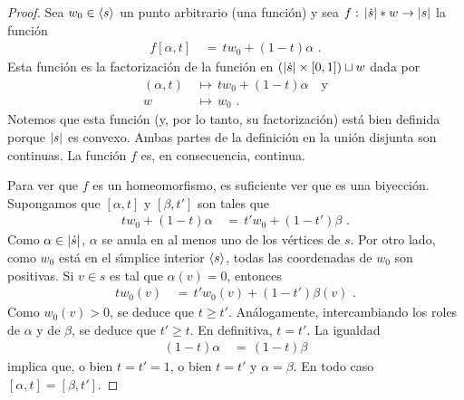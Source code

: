 \begin{proof}
	Sea $w_{0}\in\langle s\rangle$ un punto arbitrario (una funci\'{o}n)
	y sea $f:\,\left|\dot{s}\right|*w\rightarrow\left|s\right|$ la funci\'{o}n
	\begin{align*}
		f[\alpha,t] & \,=\, tw_{0}+(1-t)\alpha
		\text{ .}
	\end{align*}
	Esta funci\'{o}n es la factorizaci\'{o}n de la funci\'{o}n
	en $(\left|\dot{s}\right|\times\left[0,1\right])\sqcup w$ dada por
	\begin{align*}
		(\alpha,t) & \,\mapsto\,tw_{0}+(1-t)\alpha\quad\text{y} \\
		w & \,\mapsto \,w_{0}\text{ .}
	\end{align*}
	Notemos que esta funci\'{o}n (y, por lo tanto, su factorizaci\'{o}n)
	est\'{a} bien definida porque $\left|s\right|$ es convexo. Ambas partes
	de la definici\'{o}n en la uni\'{o}n disjunta son continuas.
	La funci\'{o}n $f$ es, en consecuencia, continua.

	Para ver que $f$ es un homeomorfismo, es suficiente ver que es una
	biyecci\'{o}n. Supongamos que $[\alpha,t]$ y $[\beta,t']$ son
	tales que
	\begin{align*}
		tw_{0}+(1-t)\alpha & \,=\,t'w_{0}+(1-t')\beta
		\text{ .}
	\end{align*}
	Como $\alpha\in\left|\dot{s}\right|$, $\alpha$ se anula en al menos uno
	de los v\'{e}rtices de $s$. Por otro lado, como $w_{0}$ est\'{a}
	en el s\'{\i}mplice interior $\langle s\rangle$, todas las
	coordenadas de $w_{0}$ son positivas. Si $v\in s$ es tal que
	$\alpha(v)=0$, entonces
	\begin{align*}
		tw_{0}(v) & \,=\,t'w_{0}(v)+(1-t')\beta(v)
		\text{ .}
	\end{align*}
	Como $w_{0}(v)>0$, se deduce que $t\geq t'$. An\'{a}logamente,
	intercambiando los roles de $\alpha$ y de $\beta$, se deduce que
	$t'\geq t$. En definitiva, $t=t'$. La igualdad
	\begin{align*}
		(1-t)\alpha & \,=\,(1-t)\beta
	\end{align*}
	implica que, o bien $t=t'=1$, o bien $t=t'$ y $\alpha=\beta$. En todo
	caso $[\alpha,t]=[\beta,t']$.


\end{proof}
